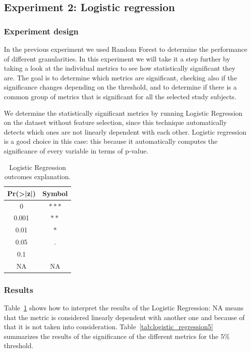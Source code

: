 \subsection{Experiment 2: Logistic regression}

\subsubsection{Experiment design}

In the previous experiment we used Random Forest to determine the performance of different granularities. In this experiment we will take it a step further by taking a look at the individual metrics to see how statistically significant they are. The goal is to determine which metrics are significant, checking also if the significance changes depending on the threshold, and to determine if there is a common group of metrics that is significant for all the selected study subjects.

We determine the statistically significant metrics by running Logistic Regression on the dataset without feature selection, since this technique automatically detects which ones are not linearly dependent with each other. Logistic regression is a good choice in this case: this because it automatically computes the significance of every variable in terms of p-value.


\begin{table}[ht]
\centering
\caption{Logistic Regression outcomes explanation.}
\label{tab:significant_sym}
\begin{tabular}{cc}
\hline
Pr(>|z|) & Symbol \\
\hline
0       & $\ast\ast\ast$      \\
0.001   & $\ast\ast$          \\
0.01    & $\ast$              \\
0.05    & .                   \\
0.1     &  \\
NA      & NA\\
\hline
\end{tabular}
\end{table}

\subsubsection{Results}

Table~\ref{tab:significant_sym} shows how to interpret the results of the Logistic Regression:  NA means that the metric is considered linearly dependent with another one and because of that it is not taken into consideration. Table~\ref{tab:logistic_regression5} summarizes the results of the significance of the different metrics for the 5\% threshold.


